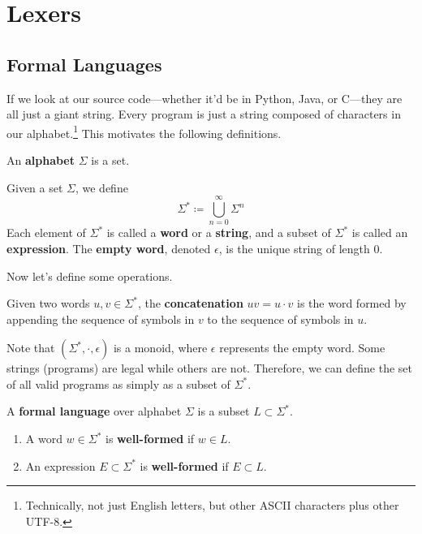 \section{Lexers}

\subsection{Formal Languages}

  If we look at our source code---whether it'd be in Python, Java, or C---they are all just a giant string. Every program is just a string composed of characters in our alphabet.\footnote{Technically, not just English letters, but other ASCII characters plus other UTF-8.} This motivates the following definitions. 

  \begin{definition}[Alphabet]
    An \textbf{alphabet} $\Sigma$ is a set. 
  \end{definition}

  \begin{definition}
    Given a set $\Sigma$, we define
    \begin{equation}
      \Sigma^\ast \coloneqq \bigcup_{n=0}^\infty \Sigma^n
    \end{equation}
    Each element of $\Sigma^\ast$ is called a \textbf{word} or a \textbf{string}, and a subset of $\Sigma^\ast$ is called an \textbf{expression}. The \textbf{empty word}, denoted $\epsilon$, is the unique string of length $0$. 
  \end{definition}

  Now let's define some operations. 

  \begin{definition}[Concatenation]
    Given two words $u, v \in \Sigma^\ast$, the \textbf{concatenation} $uv = u \cdot v$ is the word formed by appending the sequence of symbols in $v$ to the sequence of symbols in $u$. 
  \end{definition}

  Note that $(\Sigma^\ast, \cdot, \epsilon)$ is a monoid, where $\epsilon$ represents the empty word. Some strings (programs) are legal while others are not. Therefore, we can define the set of all valid programs as simply as a subset of $\Sigma^\ast$. 

  \begin{definition}
    A \textbf{formal language} over alphabet $\Sigma$ is a subset $L \subset \Sigma^\ast$. 
    \begin{enumerate}
      \item A word $w \in \Sigma^\ast$ is \textbf{well-formed} if $w \in L$. 
      \item An expression $E \subset \Sigma^\ast$ is \textbf{well-formed} if $E \subset L$. 
    \end{enumerate}
  \end{definition}

